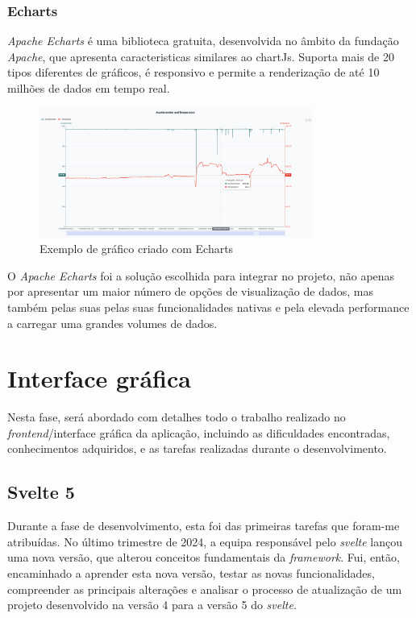 \subsubsection{\textbf{Echarts}}\label{sec:echarts}
\textit{Apache Echarts} é uma biblioteca gratuita, desenvolvida no âmbito da fundação \textit{Apache}, que apresenta caracteristicas similares ao chartJs. Suporta mais de 20 tipos diferentes de gráficos, é responsivo e permite a renderização de até 10 milhões de dados em tempo real.

\begin{figure}[h!]
    \centering
    \includegraphics[width=0.8\textwidth]{figs/echarts.png}
    \caption[Gráfico Apache Echarts]{Exemplo de gráfico criado com Echarts}
    \label{fig:echarts}
\end{figure}

O \textit{Apache Echarts} foi a solução escolhida para integrar no projeto, não apenas por apresentar um maior número de opções de visualização de dados, mas também pelas suas pelas suas funcionalidades nativas e pela elevada performance a carregar uma grandes volumes de dados. 

\clearpage
\section{Interface gráfica}\label{sec:frontend}
Nesta fase, será abordado com detalhes todo o trabalho realizado no \textit{frontend}/interface gráfica da aplicação, incluindo as dificuldades encontradas, conhecimentos adquiridos, e as tarefas realizadas durante o desenvolvimento.  

\subsection{Svelte 5}\label{sec:svelte5} %
Durante a fase de desenvolvimento, esta foi das primeiras tarefas que foram-me atribuídas. No último trimestre de 2024, a equipa responsável pelo \textit{svelte} lançou uma nova versão, que alterou conceitos fundamentais da \textit{framework}. Fui, então, encaminhado a aprender esta nova versão, testar as novas funcionalidades, compreender as principais alterações e analisar o processo de atualização de um projeto desenvolvido na versão 4 para a versão 5 do \textit{svelte}.  

